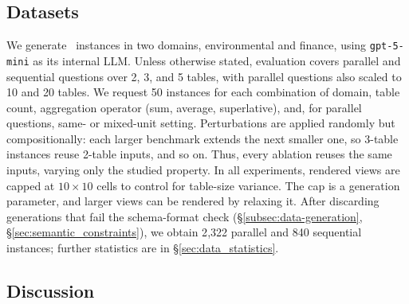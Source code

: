 \subsection{Datasets}

We generate \name\ instances in two domains, environmental and finance, using \texttt{gpt-5-mini} as its internal LLM. Unless otherwise stated, evaluation covers parallel and sequential questions over 2, 3, and 5 tables, with parallel questions also scaled to 10 and 20 tables. We request 50 instances for each combination of domain, table count, aggregation operator (sum, average, superlative), and, for parallel questions, same- or mixed-unit setting. Perturbations are applied randomly but compositionally: each larger benchmark extends the next smaller one, so 3-table instances reuse 2-table inputs, and so on. Thus, every ablation reuses the same inputs, varying only the studied property. In all experiments, rendered views are capped at $10 \times 10$ cells to control for table-size variance. The cap is a generation parameter, and larger views can be rendered by relaxing it. 
After discarding generations that fail the schema-format check (\S\ref{subsec:data-generation}, \S\ref{sec:semantic_constraints}), we obtain 2{,}322 parallel and 840 sequential instances; further statistics are in \S\ref{sec:data_statistics}.


\subsection{Discussion}
\label{sec:discussion}

